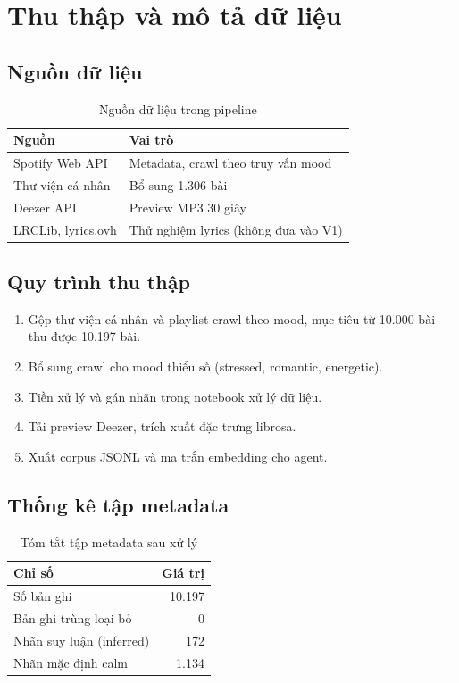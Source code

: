 \chapter{Thu thập và mô tả dữ liệu}
\label{ch:thuthap}

\section{Nguồn dữ liệu}

\begin{table}[htbp]
  \centering
  \caption{Nguồn dữ liệu trong pipeline}
  \label{tab:nguon}
  \begin{tabularx}{\textwidth}{@{}L{2.8cm}X@{}}
    \toprule
    \textbf{Nguồn} & \textbf{Vai trò} \\
    \midrule
    Spotify Web API & Metadata, crawl theo truy vấn mood \\
    Thư viện cá nhân & Bổ sung 1.306 bài \\
    Deezer API & Preview MP3 30 giây \\
    LRCLib, lyrics.ovh & Thử nghiệm lyrics (không đưa vào V1) \\
    \bottomrule
  \end{tabularx}
\end{table}

\section{Quy trình thu thập}

\begin{enumerate}[label=\arabic*.]
  \item Gộp thư viện cá nhân và playlist crawl theo mood, mục tiêu từ 10.000 bài --- thu được 10.197 bài.
  \item Bổ sung crawl cho mood thiểu số (stressed, romantic, energetic).
  \item Tiền xử lý và gán nhãn trong notebook xử lý dữ liệu.
  \item Tải preview Deezer, trích xuất đặc trưng librosa.
  \item Xuất corpus JSONL và ma trắn embedding cho agent.
\end{enumerate}

\section{Thống kê tập metadata}

\begin{table}[htbp]
  \centering
  \caption{Tóm tắt tập metadata sau xử lý}
  \label{tab:mo-ta}
  \begin{tabular}{@{}lr@{}}
    \toprule
    \textbf{Chỉ số} & \textbf{Giá trị} \\
    \midrule
    Số bản ghi & 10.197 \\
    Bản ghi trùng loại bỏ & 0 \\
    Nhãn suy luận (inferred) & 172 \\
    Nhãn mặc định calm & 1.134 \\
    \bottomrule
  \end{tabular}
\end{table}

